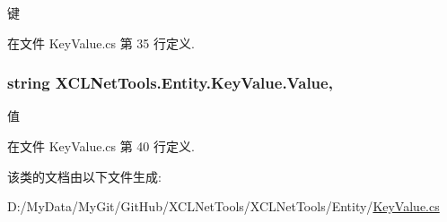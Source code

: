 键 



在文件 Key\-Value.\-cs 第 35 行定义.

\hypertarget{class_x_c_l_net_tools_1_1_entity_1_1_key_value_a9ec3c76143930f64c1e0de2074514bae}{
\subsubsection[{Value}]{\setlength{\rightskip}{0pt plus 5cm}string X\-C\-L\-Net\-Tools.\-Entity.\-Key\-Value.\-Value\hspace{0.3cm}{\ttfamily [get]}, {\ttfamily [set]}}}\label{class_x_c_l_net_tools_1_1_entity_1_1_key_value_a9ec3c76143930f64c1e0de2074514bae}


值 



在文件 Key\-Value.\-cs 第 40 行定义.



该类的文档由以下文件生成\-:\begin{DoxyCompactItemize}
\item 
D\-:/\-My\-Data/\-My\-Git/\-Git\-Hub/\-X\-C\-L\-Net\-Tools/\-X\-C\-L\-Net\-Tools/\-Entity/\hyperlink{_key_value_8cs}{Key\-Value.\-cs}\end{DoxyCompactItemize}
